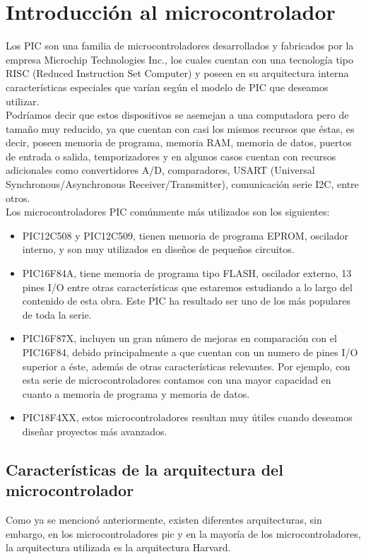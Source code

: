 \documentclass[12pt,a4paper]{article}
\begin{document}
   \section{Introducción al microcontrolador}
   Los PIC son una familia de microcontroladores desarrollados y fabricados por la empresa Microchip Technologies Inc., los cuales cuentan con una tecnología tipo RISC (Reduced Instruction Set Computer) y poseen en su arquitectura interna características especiales que varían según el modelo de PIC que deseamos utilizar.\\
   Podríamos decir que estos dispositivos se asemejan a una computadora pero de tamaño muy reducido, ya que cuentan con casi los mismos recursos que éstas, es decir, poseen memoria de programa, memoria RAM, memoria de datos, puertos de entrada o salida, temporizadores y en algunos casos cuentan con recursos adicionales como convertidores A/D, comparadores, USART (Universal Synchronous/Asynchronous Receiver/Transmitter), comunicación serie I2C, entre otros.\\
   Los microcontroladores PIC comúnmente más utilizados son los siguientes:
   \begin{itemize}
   \item PIC12C508 y PIC12C509, tienen memoria de programa EPROM, oscilador interno, y son muy utilizados en diseños de pequeños circuitos.
   \item PIC16F84A, tiene memoria de programa tipo FLASH, oscilador externo, 13 pines I/O entre otras características que estaremos estudiando a lo largo del contenido de esta obra. Este PIC ha resultado ser uno de los más populares de toda la serie.
   \item PIC16F87X, incluyen un gran número de mejoras en comparación con el PIC16F84, debido principalmente a que cuentan con un numero de pines I/O superior a éste, además de otras características relevantes. Por ejemplo, con esta serie de microcontroladores contamos con una mayor capacidad en cuanto a memoria de programa y memoria de datos.
   \item PIC18F4XX, estos microcontroladores resultan muy útiles cuando deseamos diseñar proyectos más avanzados.
   \end{itemize}
   
   \subsection{Características de la arquitectura del microcontrolador}
   Como ya se mencionó anteriormente, existen diferentes arquitecturas, sin embargo, en los microcontroladores pic y en la mayoría de los microcontroladores, la arquitectura utilizada es la arquitectura Harvard.
   
\end{document}
